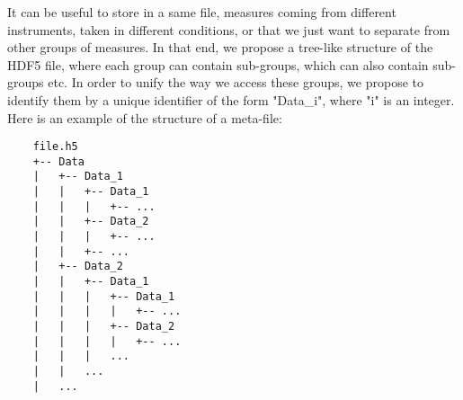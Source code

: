 It can be useful to store in a same file, measures coming from different instruments, taken in different conditions, or that we just want to separate from other groups of measures. In that end, we propose a tree-like structure of the HDF5 file, where each group can contain sub-groups, which can also contain sub-groups etc. In order to unify the way we access these groups, we propose to identify them by a unique identifier of the form "Data\_i", where "i" is an integer. Here is an example of the structure of a meta-file:

\begin{verbatim}
    file.h5
    +-- Data
    |   +-- Data_1
    |   |   +-- Data_1
    |   |   |   +-- ...
    |   |   +-- Data_2
    |   |   |   +-- ...
    |   |   +-- ...
    |   +-- Data_2
    |   |   +-- Data_1
    |   |   |   +-- Data_1
    |   |   |   |   +-- ...
    |   |   |   +-- Data_2
    |   |   |   |   +-- ...
    |   |   |   ...
    |   |   ...
    |   ...
\end{verbatim}